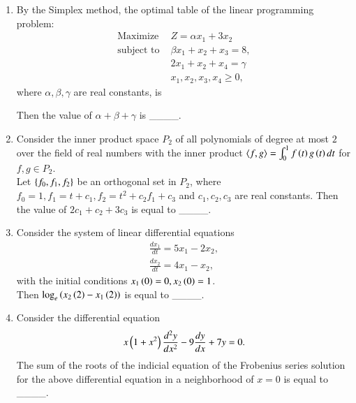 \documentclass[journal]{IEEEtran}
\begin{document}
\begin{enumerate}
    \item By the Simplex method, the optimal table of the linear programming problem:
            \begin{align*}
                \text{Maximize } &Z = \alpha x_1 + 3 x_2 \\
                \text{subject to } &\beta x_1 + x_2 + x_3 = 8,\\
                &2x_1 + x_2 + x_4 = \gamma \\
                &x_1, x_2, x_3, x_4 \geq 0,
            \end{align*}
        where $\alpha, \beta, \gamma$ are real constants, is
        \begin{table}[h!]
            \centering
            
            \caption{}
            \label{{52t}}
        \end{table}

    Then the value of $\alpha + \beta + \gamma$ is \_\_\_\_.

    \item Consider the inner product space $P_2$ of all polynomials of degree at most $2$ over the field of real numbers with the inner product $\langle f,g \rangle = \int_0^1 f \left(t\right) g \left(t\right) dt$ for $f,g \in P_2$. \\ Let $\left\{f_0, f_1, f_2\right\}$ be an orthogonal set in $P_2$, where $f_0 = 1, f_1 = t+c_1, f_2 = t^2 + c_2 f_1 + c_3$ and $c_1,c_2,c_3$ are real constants. Then the value of $2c_1 + c_2 + 3 c_3$ is equal to \_\_\_\_.

    \item Consider the system of linear differential equations
        \begin{align*}
            \frac{dx_1}{dt} = 5x_1 - 2x_2,\\
            \frac{dx_2}{dt} = 4x_1 - x_2,
        \end{align*}
        with the initial conditions $x_1 \left(0\right) = 0, x_2 \left(0\right) =1$. \\ Then $\log_e \left(x_2\left(2\right) - x_1 \left(2\right)\right)$ is equal to \_\_\_\_.

    \item Consider the differential equation
        \begin{align*}
            x \left(1 + x^2\right) \frac{d^2y}{dx^2} - 9\frac{dy}{dx} + 7y =0.
        \end{align*}
        The sum of the roots of the indicial equation of the Frobenius series solution for the above differential equation in a neighborhood of $x=0$ is equal to \_\_\_\_.


\end{enumerate}


  
\end{document}

